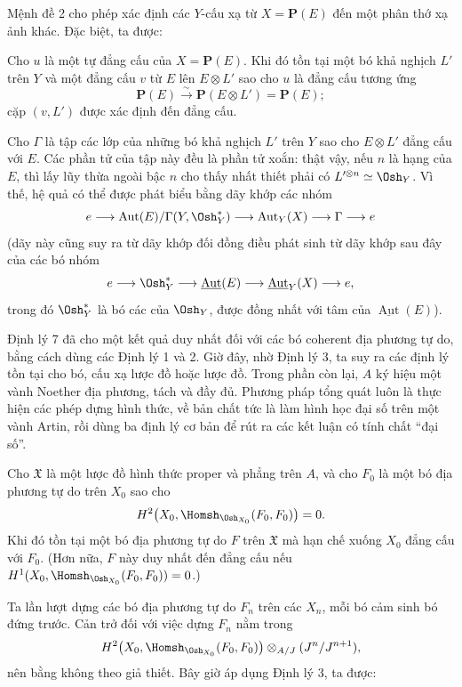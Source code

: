 Mệnh đề 2 cho phép xác định các $Y$-cấu xạ từ $X=\mathbf P(E)$ đến một phân
thớ xạ ảnh khác. Đặc biệt, ta được:

 Cho $u$ là một tự đẳng cấu của $X=\mathbf P(E)$. Khi đó tồn
tại một bó khả nghịch $L'$ trên $Y$ và một đẳng cấu $v$ từ $E$ lên
$E\otimes L'$ sao cho $u$ là đẳng cấu tương ứng
\[
  \mathbf P(E)\xrightarrow{\sim}\mathbf P(E\otimes L')=\mathbf P(E);
\]
cặp $(v,L')$ được xác định đến đẳng cấu.

Cho $\Gamma$ là tập các lớp của những bó khả nghịch $L'$ trên $Y$ sao cho
$E\otimes L'$ đẳng cấu với $E$. Các phần tử của tập này đều là phần tử xoắn:
thật vậy, nếu $n$ là hạng của $E$, thì lấy lũy thừa ngoài bậc $n$ cho thấy
nhất thiết phải có
$L'^{\otimes n}\simeq\Osh_Y$. Vì thế, hệ quả có thể được phát biểu bằng dãy
khớp các nhóm
\[
  e\longrightarrow
  \operatorname{Aut}(E)/\Gamma(Y,\Osh_Y^*)
  \longrightarrow \operatorname{Aut}_Y(X)
  \longrightarrow \Gamma\longrightarrow e
\]
(dãy này cũng suy ra từ dãy khớp đối đồng điều phát sinh từ dãy khớp sau đây
của các bó nhóm
\[
  e\longrightarrow \Osh_Y^*
  \longrightarrow \underline{\operatorname{Aut}}(E)
  \longrightarrow \underline{\operatorname{Aut}}_Y(X)
  \longrightarrow e,
\]
trong đó $\Osh_Y^*$ là bó các  của $\Osh_Y$, được đồng nhất với
tâm của $\underline{\operatorname{Aut}}(E)$).


Định lý 7 đã cho một kết quả duy nhất đối với các bó coherent địa phương tự do,
bằng cách dùng các Định lý 1 và 2. Giờ đây, nhờ Định lý 3, ta suy ra các định
lý tồn tại cho bó, cấu xạ lược đồ hoặc lược đồ. Trong phần còn lại, $A$ ký hiệu
một vành Noether địa phương, tách và đầy đủ. Phương pháp tổng quát luôn là thực
hiện các phép dựng hình thức, về bản chất tức là làm hình học đại số trên một
vành Artin, rồi dùng ba định lý cơ bản để rút ra các kết luận có tính chất
“đại số”.

 Cho $\mathfrak X$ là một lược đồ hình thức proper và phẳng
trên $A$, và cho $F_0$ là một bó địa phương tự do trên $X_0$ sao cho
\[
  H^2\bigl(X_0,\Homsh_{\Osh_{X_0}}(F_0,F_0)\bigr)=0.
\]
Khi đó tồn tại một bó địa phương tự do $F$ trên $\mathfrak X$ mà hạn chế xuống
$X_0$ đẳng cấu với $F_0$. (Hơn nữa, $F$ này duy nhất đến đẳng cấu nếu
$H^1(X_0,\Homsh_{\Osh_{X_0}}(F_0,F_0))=0$.)

Ta lần lượt dựng các bó địa phương tự do $F_n$ trên các $X_n$, mỗi bó cảm sinh
bó đứng trước. Cản trở đối với việc dựng $F_n$ nằm trong
\[
  H^2\bigl(X_0,\Homsh_{\Osh_{X_0}}(F_0,F_0)\bigr)
  \otimes_{A/J}(J^n/J^{n+1}),
\]
nên bằng không theo giả thiết. Bây giờ áp dụng Định lý 3, ta được:

